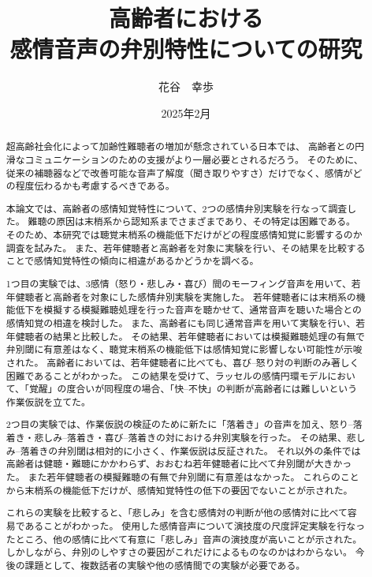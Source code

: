 \documentclass[11pt]{jreport}
\title{高齢者における\\感情音声の弁別特性についての研究}
\author{花谷　幸歩}
\date{2025年2月}	%
\begin{document}
\maketitle



\begin{abstract}
超高齢社会化によって加齢性難聴者の増加が懸念されている日本では、
高齢者との円滑なコミュニケーションのための支援がより一層必要とされるだろう。
そのために、従来の補聴器などで改善可能な音声了解度（聞き取りやすさ）だけでなく、感情がどの程度伝わるかも考慮するべきである。

本論文では、高齢者の感情知覚特性について、2つの感情弁別実験を行なって調査した。
難聴の原因は末梢系から認知系までさまざまであり、その特定は困難である。
そのため、本研究では聴覚末梢系の機能低下だけがどの程度感情知覚に影響するのか調査を試みた。
また、若年健聴者と高齢者を対象に実験を行い、その結果を比較することで感情知覚特性の傾向に相違があるかどうかを調べる。

1つ目の実験では、3感情（怒り・悲しみ・喜び）間のモーフィング音声を用いて、若年健聴者と高齢者を対象にした感情弁別実験を実施した。
若年健聴者には末梢系の機能低下を模擬する模擬難聴処理を行った音声を聴かせて、通常音声を聴いた場合との感情知覚の相違を検討した。
また、高齢者にも同じ通常音声を用いて実験を行い、若年健聴者の結果と比較した。
その結果、若年健聴者においては模擬難聴処理の有無で弁別閾に有意差はなく、聴覚末梢系の機能低下は感情知覚に影響しない可能性が示唆された。
高齢者においては、若年健聴者に比べても、喜び--怒り対の判断のみ著しく困難であることがわかった。
この結果を受けて、ラッセルの感情円環モデルにおいて、「覚醒」の度合いが同程度の場合、「快--不快」の判断が高齢者には難しいという作業仮説を立てた。

2つ目の実験では、作業仮説の検証のために新たに「落着き」の音声を加え、怒り--落着き・悲しみ--落着き・喜び--落着きの対における弁別実験を行った。
その結果、悲しみ--落着きの弁別閾は相対的に小さく、作業仮説は反証された。
それ以外の条件では高齢者は健聴・難聴にかかわらず、おおむね若年健聴者に比べて弁別閾が大きかった。 
また若年健聴者の模擬難聴の有無で弁別閾に有意差はなかった。
これらのことから末梢系の機能低下だけが、感情知覚特性の低下の要因でないことが示された。

これらの実験を比較すると、「悲しみ」を含む感情対の判断が他の感情対に比べて容易であることがわかった。
使用した感情音声について演技度の尺度評定実験を行なったところ、他の感情に比べて有意に「悲しみ」音声の演技度が高いことが示された。
しかしながら、弁別のしやすさの要因がこれだけによるものなのかはわからない。
今後の課題として、複数話者の実験や他の感情間での実験が必要である。




\end{abstract}
\end{document}
